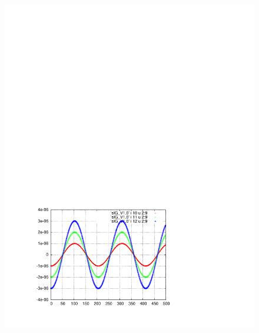 \documentclass[]{article}
\begin{document}
\begin{figure}[h]
\begin{minipage}[b]{0.45\linewidth}
\includegraphics[scale=0.55]{pdf/delta_vs_turn_V1p0.pdf}
\end{minipage}
%
%
\begin{minipage}[b]{0.45\linewidth}
\centering

\end{minipage}
\end{figure}
\end{document}
